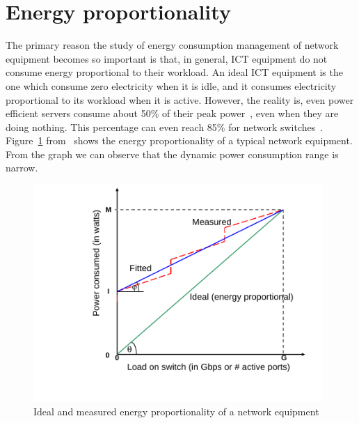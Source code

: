 \section{Energy proportionality}
\label{section:energyproportionality}
The primary reason the study of energy consumption management of network equipment becomes so important is that, in general, ICT equipment do not consume energy proportional to their workload. An ideal ICT equipment is the one which consume zero electricity when it is idle, and it consumes electricity proportional to its workload when it is active. However, the reality is, even power efficient servers consume about 50\% of their peak power~\cite{DBLP:journals/computer/BarrosoH07}, even when they are doing nothing. This percentage can even reach 85\% for network switches~\cite{DBLP:conf/IEEEcloud/FiandrinoKBZ15}. Figure~\ref{fig:energyproportionality} from~\cite{DBLP:conf/networking/MahadevanSBR09} shows the energy proportionality of a typical network equipment. From the graph we can observe that the dynamic power consumption range is narrow.
\begin{figure}[ht]
	\begin{center}
		\includegraphics[width=11cm]{images/energyproportionality.pdf}
		\caption{Ideal and measured energy proportionality of a network equipment \cite{DBLP:conf/networking/MahadevanSBR09}}
		\label{fig:energyproportionality}
	\end{center}
\end{figure}
